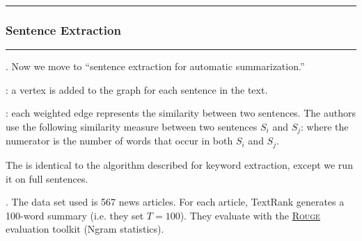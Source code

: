 \documentclass[11pt]{article}
\newcommand\myspace[1][]{\vspace{#1\bigskipamount}}
\newcommand\p{\Needspace{10\baselineskip} \noindent}
\newcommand\subsub[1]{\Needspace{15\baselineskip}\hrule\subsubsection{#1}\hrule}
\begin{document}
\myspace
\subsub{Sentence Extraction} 
\myspace 

\p {}. Now we move to ``sentence extraction for automatic summarization.''
\begin{compactitem}
	\item {}: a vertex is added to the graph for each sentence in the text.
	\item {}: each weighted edge represents the similarity between two sentences. The authors use the following similarity measure between two sentences $S_i$ and $S_j$:
		where the numerator is the number of words that occur in both $S_i$ and $S_j$. 
\end{compactitem}
The  is identical to the algorithm described for keyword extraction, except we run it on full sentences.

\myspace
\p {}. The data set used is 567 news articles. For each article, TextRank generates a 100-word summary (i.e. they set $T = 100$). They evaluate with the \href{http://www.isi.edu/licensed-sw/see/rouge/}{\textsc{Rouge}} evaluation toolkit (Ngram statistics). 
\end{document}
